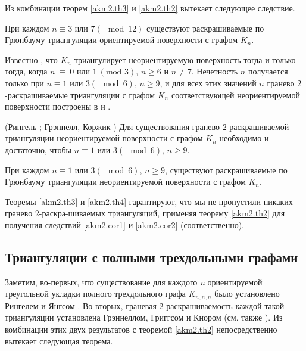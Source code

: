 Из комбинации теорем \ref{akm2.th3} и \ref{akm2.th2} вытекает следующее следствие.


\begin{corollary}
\label{akm2.cor1}
При каждом $n \equiv 3$  или $7 (\mod 12)$  существуют раскрашиваемые по Грюнбауму триангуляции ориентируемой поверхности с графом $K_n$.
\end{corollary}

Известно \cite{ringel}, что $K_n$ триангулирует неориентируемую поверхность тогда и только тогда, когда $n\ \equiv\ 0\text{ или }1\ (\text{mod }3)$, $n\ge6\text{ и }n\neq7$. Нечетность $n$ получается только при $n \equiv 1$  или $3 (\mod 6)$, $n \ge 9$, и для всех этих значений $n$ гранево $2$-раскрашиваемые триангуляции с графом $K_n$ соответствующей неориентируемой поверхности построены в \cite{ringel} и \cite{korzhikvp}.

\begin{theorem}
\label{akm2.th4}
(Рингель \cite{ringel}; Грэннелл, Коржик \cite{korzhikvp}) Для существования гранево \linebreak $2$-раскрашиваемой триангуляции неориентируемой поверхности с графом $K_n$ необходимо и достаточно, чтобы $n\equiv 1$ или $3 (\mod 6)$, $n\ge9$.
\end{theorem}


\begin{corollary}
\label{akm2.cor2}
При каждом $n\equiv 1$  или $3  (\mod 6)$, $n\ge9$, существуют раскрашиваемые по Грюнбауму триангуляции неориентируемой поверхности с графом $K_n$.
\end{corollary}

Теоремы \ref{akm2.th3} и \ref{akm2.th4} гарантируют, что мы не пропустили никаких гранево  $2$-раскра-\linebreak шиваемых триангуляций, применяя теорему \ref{akm2.th2} для получения следствий \ref{akm2.cor1} и \ref{akm2.cor2} (соответственно).



\subsection{Триангуляции с полными трехдольными графами}

Заметим, во-первых, что существование для каждого \textit{n} ориентируемой треугольной укладки полного трехдольного графа $K_{n,n,n}$ было установлено Рингелем и Янгсом \cite{ringyung}. Во-вторых, граневая $2$-раскрашиваемость каждой такой триангуляции установлена Грэннеллом, Григгсом и Кнором \cite{granel4} (см. также \cite{granel2}). Из комбинации этих двух результатов с теоремой \ref{akm2.th2} непосредственно вытекает следующая теорема.

